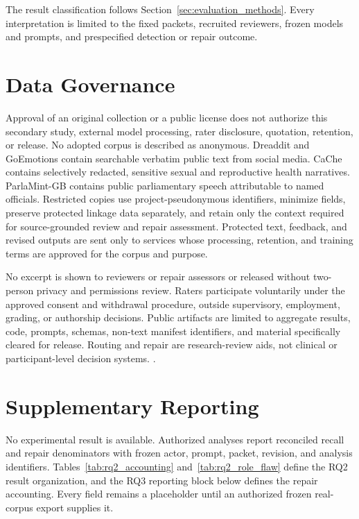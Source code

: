 The result classification follows Section~\ref{sec:evaluation_methods}. Every interpretation is limited to the fixed packets, recruited reviewers, frozen models and prompts, and prespecified detection or repair outcome.

\section{Data Governance}
\label{sec:detailed_ethics}

Approval of an original collection or a public license does not authorize this secondary study, external model processing, rater disclosure, quotation, retention, or release. No adopted corpus is described as anonymous. Dreaddit and GoEmotions contain searchable verbatim public text from social media. CaChe contains selectively redacted, sensitive sexual and reproductive health narratives. ParlaMint-GB contains public parliamentary speech attributable to named officials. Restricted copies use project-pseudonymous identifiers, minimize fields, preserve protected linkage data separately, and retain only the context required for source-grounded review and repair assessment. Protected text, feedback, and revised outputs are sent only to services whose processing, retention, and training terms are approved for the corpus and purpose.

No excerpt is shown to reviewers or repair assessors or released without two-person privacy and permissions review. Raters participate voluntarily under the approved consent and withdrawal procedure, outside supervisory, employment, grading, or authorship decisions. Public artifacts are limited to aggregate results, code, prompts, schemas, non-text manifest identifiers, and material specifically cleared for release. Routing and repair are research-review aids, not clinical or participant-level decision systems. .

\section{Supplementary Reporting}
\label{sec:appendix_results}

No experimental result is available. Authorized analyses report reconciled recall and repair denominators with frozen actor, prompt, packet, revision, and analysis identifiers. Tables~\ref{tab:rq2_accounting} and~\ref{tab:rq2_role_flaw} define the RQ2 result organization, and the RQ3 reporting block below defines the repair accounting. Every field remains a placeholder until an authorized frozen real-corpus export supplies it.

